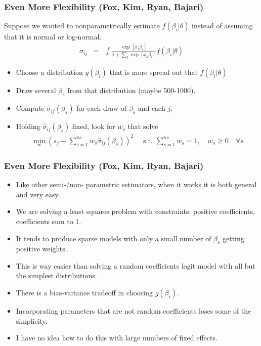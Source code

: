 \documentclass[aspectratio=169,11pt]{beamer}
\begin{document}
\begin{frame}
\frametitle{Even More Flexibility (Fox, Kim, Ryan, Bajari)}
Suppose we wanted to nonparametrically estimate $f(\beta_i | \theta)$ instead of assuming that it is normal or log-normal.
\begin{eqnarray*}
\sigma_{ij} &=& \int \frac{\exp[x_{j} \beta_i  ]}{1+\sum_k \exp[x_{k} \beta_i  ]} f(\beta_i | \theta)
\end{eqnarray*}
\begin{itemize}
\item Choose a distribution $g(\beta_i)$ that is more spread out that $f(\beta_i | \theta)$
\item Draw several $\beta_{s}$ from that distribution (maybe 500-1000).
\item Compute $\hat{\sigma}_{ij}(\beta_s)$ for each draw of $\beta_s$ and each $j$.
\item Holding $\hat{\sigma}_{ij}(\beta_s)$ fixed, look for $w_s$ that solve
\begin{eqnarray*}
\min_w \left(s_j -  \sum_{s=1}^{ns} w_s \hat{\sigma}_{ij}(\beta_s) \right)^2 \quad \mbox{ s.t. } \sum_{s=1}^{ns} w_s = 1, \quad w_s \geq 0 \quad \forall s
\end{eqnarray*}
\end{itemize}
\end{frame}

\begin{frame}
\frametitle{Even More Flexibility (Fox, Kim, Ryan, Bajari)}
\begin{itemize}
\item Like other semi-/non- parametric estimators, when it works it is both general and very easy.
\item We are solving a least squares problem with constraints: positive coefficients, coefficients sum to 1.
\item It tends to produce \alert{sparse models} with only a small number of $\beta_s$ getting positive weights.
\item This is way easier than solving a random coefficients logit model with all but the simplest distributions.
\item There is a bias-variance tradeoff in choosing $g(\beta_i)$.
\item Incorporating parameters that are not random coefficients loses some of the simplicity.
\item I have no idea how to do this with large numbers of fixed effects.
\end{itemize}
\end{frame}
\end{document}
